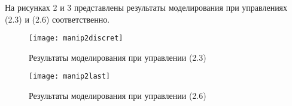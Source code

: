 На рисунках 2 и 3 представлены результаты моделирования при управлениях (2.3) и (2.6) соответственно. 

\begin{figure}[h]
 	\centering
 	\texttt{[image: manip2discret]}
 	\caption{Результаты моделирования при управлении (2.3)}
\end{figure}

\begin{figure}[h]
	\centering
	\texttt{[image: manip2last]}
	\caption{Результаты моделирования при управлении (2.6)}
\end{figure}
